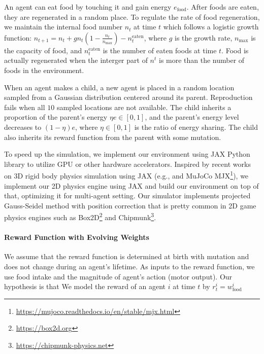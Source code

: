 An agent can eat food by touching it and gain energy $e_{\mathrm{food}}$. After foods are eaten, they are regenerated in a random place. To regulate the rate of food regeneration, we maintain the internal food number $n_{t}$ at time $t$ which follows a logistic growth function: $n_{t + 1} = n_{t} + gn_{t}(1 - \frac{n_{t}}{n_{\mathrm{max}}}) - n_{t}^{\mathrm{eaten}}$, where $g$ is the growth rate, $n_{\mathrm{max}}$ is the capacity of food, and $n_{t}^{\mathrm{eaten}}$ is the number of eaten foods at time $t$. Food is actually regenerated when the interger part of $n^{t}$ is more than the number of foods in the environment.

When an agent makes a child, a new agent is placed in a random location sampled from a Gaussian distribution centered around its parent. Reproduction fails when all $10$ sampled locations are not available. The child inherits a proportion of the parent's energy $\eta e \in [0, 1]$, and the parent's energy level decreases to $(1-\eta)e$, where $\eta \in [0, 1]$ is the ratio of energy sharing. The child also inherits its reward function from the parent with some mutation.

To speed up the simulation, we implement our environment using JAX Python library \citep{jax2018github} to utilize GPU or other hardware accelerators. Inspired by recent works on 3D rigid body physics simulation using JAX (e.g., \citet{brax2021github} and MuJoCo \citep{todorov2012mujoco} MJX\footnote{\url{https://mujoco.readthedocs.io/en/stable/mjx.html}}), we implement our 2D physics engine using JAX and build our environment on top of that, optimizing it for multi-agent setting. Our simulator implements projected Gauss-Seidel method with position correction \citep{catto2005iterative} that is pretty common in 2D game physics engines such as Box2D\footnote{\url{https://box2d.org}} and Chipmunk\footnote{\url{https://chipmunk-physics.net}}.

\paragraph{Reward Function with Evolving Weights}
We assume that the reward function is determined at birth with mutation and does not change during an agent's lifetime. As inputs to the reward function, we use food intake and the magnitude of agent's action (motor output). Our hypothesis is that
We model the reward of an agent $i$ at time $t$ by $r^{i}_{t} = w_{\mathrm{food}}^{i}$

